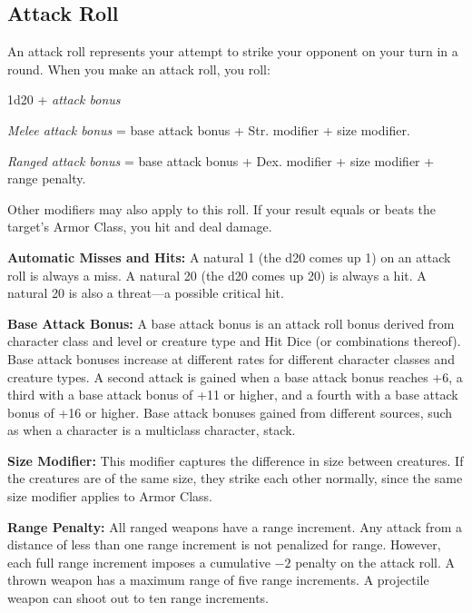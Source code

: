 \subsection{Attack Roll}
An attack roll represents your attempt to strike your opponent on your turn in a round. When you make an attack roll, you roll:

\begin{Formula*}{1d20 + \textit{attack bonus}}
	\item \textit{Melee attack bonus} = base attack bonus + Str. modifier + size modifier.
	\item \textit{Ranged attack bonus} = base attack bonus + Dex. modifier + size modifier + range penalty.
\end{Formula*}

Other modifiers may also apply to this roll. If your result equals or beats the target's Armor Class, you hit and deal damage.

\textbf{Automatic Misses and Hits:} A natural 1 (the d20 comes up 1) on an attack roll is always a miss. A natural 20 (the d20 comes up 20) is always a hit. A natural 20 is also a threat---a possible critical hit.

\textbf{Base Attack Bonus:} A base attack bonus is an attack roll bonus derived from character class and level or creature type and Hit Dice (or combinations thereof). Base attack bonuses increase at different rates for different character classes and creature types. A second attack is gained when a base attack bonus reaches +6, a third with a base attack bonus of +11 or higher, and a fourth with a base attack bonus of +16 or higher. Base attack bonuses gained from different sources, such as when a character is a multiclass character, stack.

\textbf{Size Modifier:} This modifier captures the difference in size between creatures. If the creatures are of the same size, they strike each other normally, since the same size modifier applies to Armor Class.


\textbf{Range Penalty:} All ranged weapons have a range increment. Any attack from a distance of less than one range increment is not penalized for range. However, each full range increment imposes a cumulative $-2$ penalty on the attack roll. A thrown weapon has a maximum range of five range increments. A projectile weapon can shoot out to ten range increments.
